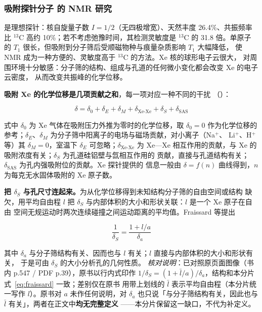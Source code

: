 \subsubsection{吸附探针分子 \texorpdfstring{}{129Xe} 的 NMR 研究}
\label{sec:xe}

 是理想探针：核自旋量子数 $I=1/2$（无四极增宽）、天然丰度 26.4\%、共振频率比
$^{13}$C 高约 10\%；若不考虑弛豫时间，其检测灵敏度是 $^{13}$C 的 31.8 倍。单原子
 的 $T_1$ 很长，但吸附到分子筛后受顺磁物种与痕量杂质影响 $T_1$ 大幅降低，
使  NMR 成为一种方便的、灵敏度高于 $^{13}$C 的方法。Xe 核的球形电子云很大，
对周围环境十分敏感：分子筛的结构、组成与孔道的任何微小变化都会改变 Xe 的电子云密度，
从而改变共振峰的化学位移。

\begin{principle}
\textbf{吸附 Xe 的化学位移是几项贡献之和}，每一项对应一种不同的干扰
（）：

\begin{equation}
\label{eq:xe-shift}
\delta=\delta_{0}+\delta_{E}+\delta_{M}+\delta_{\mathrm{Xe\text{-}Xe}}+\delta_{S}+\delta_{\mathrm{SAS}}
\end{equation}

式中 $\delta_{0}$ 为 Xe 气体在吸附压力外推为零时的化学位移，取 $\delta_{0}=0$ 作为化学位移的
参考；$\delta_{E}$、$\delta_{M}$ 为分子筛中阳离子的电场与磁场贡献，对小离子（Na$^{+}$、
Li$^{+}$、H$^{+}$ 等）其 $\delta_{M}=0$，室温下 $\delta_{E}$ 可忽略；$\delta_{\mathrm{Xe\text{-}Xe}}$
为 Xe—Xe 相互作用的贡献，与 Xe 的吸附浓度有关；$\delta_{S}$ 为孔道硅铝壁与氙相互作用的
贡献，直接与孔道结构有关；$\delta_{\mathrm{SAS}}$ 为孔内强吸附位的贡献。Xe 探针提供的
信息一般由 $\delta=f(n)$ 曲线得到，$n$ 为每克无水固体吸附的 Xe 原子数。

\textbf{把 $\delta_{S}$ 与孔尺寸连起来。}为从化学位移得到未知结构分子筛的自由空间或结构
缺欠，用平均自由程 $l$ 把 $\delta_{S}$ 与内部体积的大小和形状关联：$l$ 是一个 Xe 原子在自由
空间无规运动时两次连续碰撞之间运动距离的平均值。Fraissard 等提出

\begin{equation}
\label{eq:fraissard}
\frac{1}{\delta_{S}}=\frac{1+l/a}{\delta_{a}}
\end{equation}

其中 $\delta_{a}$ 与分子筛结构有关、因而也与 $l$ 有关；$l$ 直接与内部体积的大小和形状有关，
于是可由 $\delta_{S}$ 的大小分析孔的几何性质。
\emph{核对说明}：已对照原页面图像（书内 p.547 / PDF p.39），原书以行内式印作
$1/\delta_{S}=(1+\bar{l}/a)/\delta_{a}$，结构和本分片式~\eqref{eq:fraissard} 一致；差别仅在原书
用带上划线的 $\bar{l}$ 表示平均自由程（本分片统一写作 $l$）。原书对 $a$ 未作任何说明，对
$\delta_{a}$ 也只说「与分子筛结构有关，因此也与 $\bar{l}$ 有关」，两者在正文中\textbf{均无完整定义}
——本分片保留这一缺口，不代为补定义。
\end{principle}

